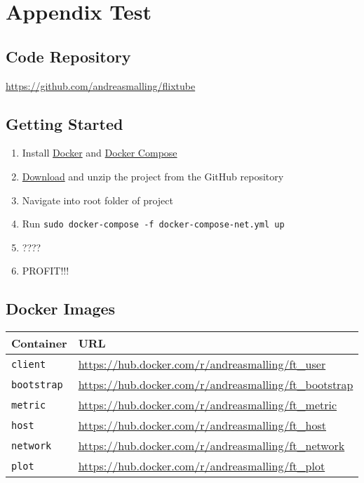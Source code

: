 \chapter{Appendix Test}
\section{Code Repository}
\label{app:code}

\url{https://github.com/andreasmalling/flixtube}

\section{Getting Started}
\begin{enumerate}
    \item Install \href{https://docs.docker.com/install/}{Docker} and \href{https://docs.docker.com/compose/install/}{Docker Compose}
    \item \href{https://github.com/andreasmalling/flixtube/archive/master.zip}{Download} and unzip the project from the GitHub repository
    \item Navigate into root folder of project
    \item Run \lstinline[columns=fixed]{sudo docker-compose -f docker-compose-net.yml up}
    \item ????
    \item PROFIT!!!
\end{enumerate}

\section{Docker Images}
\begin{table}[ht]
\centering
{}
\begin{tabular}{ll}
\toprule Container & URL \\\midrule
\texttt{client}     & \url{https://hub.docker.com/r/andreasmalling/ft_user} \\
\texttt{bootstrap}  & \url{https://hub.docker.com/r/andreasmalling/ft_bootstrap}    \\
\texttt{metric}     & \url{https://hub.docker.com/r/andreasmalling/ft_metric}   \\
\texttt{host}       & \url{https://hub.docker.com/r/andreasmalling/ft_host} \\
\texttt{network}    & \url{https://hub.docker.com/r/andreasmalling/ft_network} \\
\texttt{plot}       & \url{https://hub.docker.com/r/andreasmalling/ft_plot}\\\bottomrule
\end{tabular}

\end{table}

